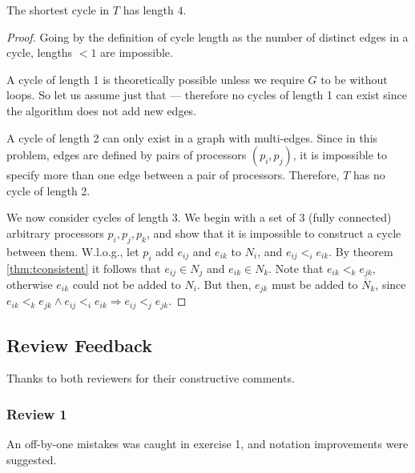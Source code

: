 \begin{theorem}
The shortest cycle in $T$ has length $4$.
\end{theorem}

\begin{proof}
Going by the definition of cycle length as the number of distinct edges in a
cycle, lengths $< 1$ are impossible.

A cycle of length 1 is theoretically possible unless we require $G$ to be
without loops. So let us assume just that --- therefore no cycles of length
1 can exist since the algorithm does not add new edges.

A cycle of length 2 can only exist in a graph with multi-edges. 
Since in this problem, edges are defined by pairs of processors $(p_i, p_j)$,
it is impossible to specify more than one edge between a pair of processors.
Therefore, $T$ has no cycle of length 2.

We now consider cycles of length 3. We begin with a set of 3 (fully connected)
arbitrary processors
$p_i, p_j, p_k$, and show that it is impossible to construct a cycle between them.
W.l.o.g., let $p_i$ add $e_{ij}$ and $e_{ik}$ to $N_i$, and $e_{ij} <_i e_{ik}$.
By theorem \ref{thm:tconsistent} it follows that $e_{ij} \in N_j$ and $e_{ik}
\in N_k$. Note that $e_{ik} <_k e_{jk}$, otherwise $e_{ik}$ could not be added
to $N_i$. But then, $e_{jk}$ must be added to $\overline{N}_k$, since
 $e_{ik} <_k e_{jk} \wedge e_{ij} <_i e_{ik} \Rightarrow e_{ij} <_j e_{jk}$.
\end{proof}

\pagebreak
\subsection*{Review Feedback}

Thanks to both reviewers for their constructive comments.

\begin{comment}
The final version of your homework must also include a (single) grade and some
explanatory text for every review you have got, which shall reflect its
appropriateness, utility, ... for improving your work.
\end{comment}

\subsubsection*{Review 1}

An off-by-one mistakes was caught in
exercise 1, and notation improvements were suggested.

